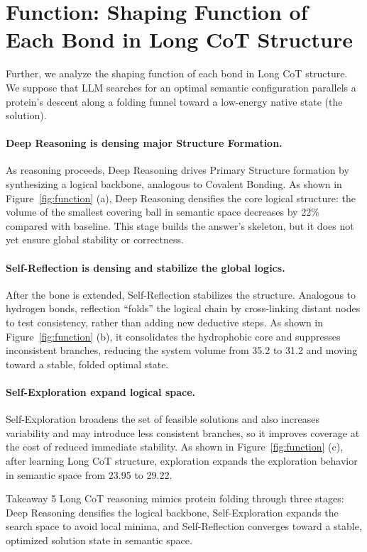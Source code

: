 \section{Function: Shaping Function of Each Bond in Long CoT Structure}
Further, we analyze the shaping function of each bond in Long CoT structure. We suppose that LLM searches for an optimal semantic configuration parallels a protein’s descent along a folding funnel toward a low-energy native state (the solution).\vspace{-8pt}


\paragraph{\textbf{Deep Reasoning is densing major Structure Formation.}} As reasoning proceeds, Deep Reasoning drives Primary Structure formation by synthesizing a logical backbone, analogous to Covalent Bonding. As shown in Figure~\ref{fig:function} (a), Deep Reasoning densifies the core logical structure: the volume of the smallest covering ball in semantic space decreases by 22\% compared with baseline. This stage builds the answer’s skeleton, but it does not yet ensure global stability or correctness.\vspace{-8pt}

\paragraph{\textbf{Self-Reflection is densing and stabilize the global logics.}} After the bone is extended, Self-Reflection stabilizes the structure. Analogous to hydrogen bonds, reflection “folds” the logical chain by cross-linking distant nodes to test consistency, rather than adding new deductive steps. As shown in Figure~\ref{fig:function} (b), it consolidates the hydrophobic core and suppresses inconsistent branches, reducing the system volume from 35.2 to 31.2 and moving toward a stable, folded optimal state.\vspace{-8pt}

\paragraph{\textbf{Self-Exploration expand logical space.}} Self-Exploration broadens the set of feasible solutions and also increases variability and may introduce less consistent branches, so it improves coverage at the cost of reduced immediate stability. As shown in Figure~\ref{fig:function} (c), after learning Long CoT structure, exploration expands the exploration behavior in semantic space from 23.95 to 29.22.



\begin{TakeawayBox}{Takeaway 5}
Long CoT reasoning mimics protein folding through three stages:
Deep Reasoning densifies the logical backbone, Self-Exploration expands the search space to avoid local minima, and Self-Reflection converges toward a stable, optimized solution state in semantic space.
\end{TakeawayBox}